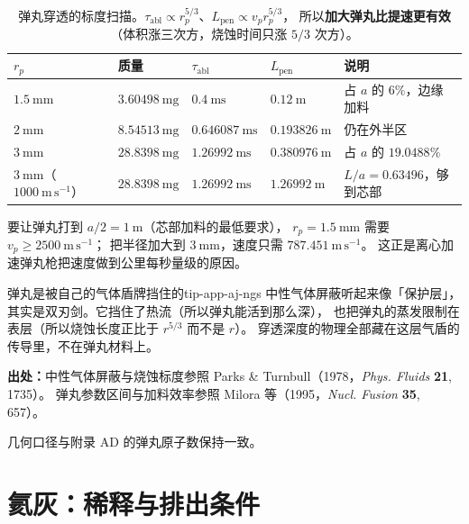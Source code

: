 \begin{table}[htbp]
\centering
\small
\caption{弹丸穿透的标度扫描。$\tau_{\mathrm{abl}} \propto r_p^{5/3}$、$L_{\mathrm{pen}} \propto v_pr_p^{5/3}$，
所以\textbf{加大弹丸比提速更有效}（体积涨三次方，烧蚀时间只涨 $5/3$ 次方）。}
\label{tab:app-aj-pellet}
\begin{tabular}{p{2.6cm}p{2.6cm}p{2.6cm}p{2.6cm}p{3.4cm}}
\toprule
$r_p$ & 质量 & $\tau_{\mathrm{abl}}$ & $L_{\mathrm{pen}}$ & 说明 \\
\midrule
$1.5\ \mathrm{mm}$ & $3.60498\ \mathrm{mg}$ & $0.4\ \mathrm{ms}$ & $0.12\ \mathrm{m}$ & 占 $a$ 的 $6\%$，边缘加料 \\
$2\ \mathrm{mm}$ & $8.54513\ \mathrm{mg}$ & $0.646087\ \mathrm{ms}$ & $0.193826\ \mathrm{m}$ & 仍在外半区 \\
$3\ \mathrm{mm}$ & $28.8398\ \mathrm{mg}$ & $1.26992\ \mathrm{ms}$ & $0.380976\ \mathrm{m}$ & 占 $a$ 的 $19.0488\%$ \\
$3\ \mathrm{mm}$（$1000\ \mathrm{m\,s^{-1}}$） & $28.8398\ \mathrm{mg}$ & $1.26992\ \mathrm{ms}$ & $1.26992\ \mathrm{m}$ & $L/a = 0.63496$，够到芯部 \\
\bottomrule
\end{tabular}

\end{table}

要让弹丸打到 $a/2 = 1\ \mathrm{m}$（芯部加料的最低要求），
$r_p = 1.5\ \mathrm{mm}$ 需要 $v_p \ge 2500\ \mathrm{m\,s^{-1}}$；
把半径加大到 $3\ \mathrm{mm}$，速度只需 $787.451\ \mathrm{m\,s^{-1}}$。
这正是离心加速弹丸枪把速度做到公里每秒量级的原因。

\begin{tip}{弹丸是被自己的气体盾牌挡住的}{tip-app-aj-ngs}
中性气体屏蔽听起来像「保护层」，其实是双刃剑。它挡住了热流（所以弹丸能活到那么深），
也把弹丸的蒸发限制在表层（所以烧蚀长度正比于 $r^{5/3}$ 而不是 $r$）。
穿透深度的物理全部藏在这层气盾的传导里，不在弹丸材料上。
\end{tip}

{\footnotesize
\textbf{出处：}中性气体屏蔽与烧蚀标度参照 Parks \& Turnbull（1978，\emph{Phys. Fluids} \textbf{21}, 1735）。
弹丸参数区间与加料效率参照 Milora 等（1995，\emph{Nucl. Fusion} \textbf{35}, 657）。

几何口径与附录 AD 的弹丸原子数保持一致。
}

\section{氦灰：稀释与排出条件}
\label{sec:app-aj-ash}

